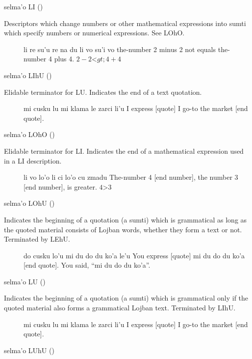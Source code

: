 selma'o LI () 

Descriptors which change numbers or other mathematical
    expressions into sumti which specify numbers or numerical
    expressions. See LOhO.
\begin{description}
\item[] li re su'u re na du li vo su'i vo the-number 2 minus 2 not equals the-number 4 plus 4. $2 - 2 $<$gt; 4 + 4$
\end{description}

selma'o LIhU () 

Elidable terminator for LU. Indicates the end of a text
    quotation.
\begin{description}
\item[] mi cusku lu mi klama le zarci li'u I express [quote] I go-to the market [end quote].
\end{description}

selma'o LOhO () 

Elidable terminator for LI. Indicates the end of a
    mathematical expression used in a LI description.
\begin{description}
\item[] li vo lo'o li ci lo'o cu zmadu The-number 4 [end number], the number 3 [end number], is greater. $4 $>$3$
\end{description}

selma'o LOhU () 

Indicates the beginning of a quotation (a sumti) which is
    grammatical as long as the quoted material consists of Lojban
    words, whether they form a text or not. Terminated by LEhU.
\begin{description}
\item[] do cusku lo'u mi du do du ko'a le'u You express [quote] mi du do du ko'a [end quote]. You said, ``mi du do du ko'a''.
\end{description}

selma'o LU () 

Indicates the beginning of a quotation (a sumti) which is
    grammatical only if the quoted material also forms a
    grammatical Lojban text. Terminated by LIhU.
\begin{description}
\item[] mi cusku lu mi klama le zarci li'u I express [quote] I go-to the market [end quote].
\end{description}

selma'o LUhU () 


